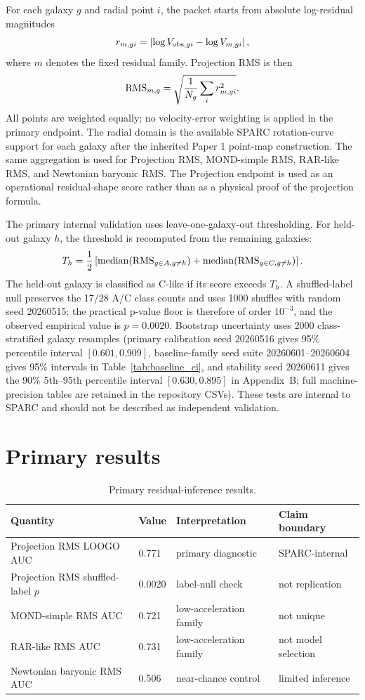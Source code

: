 \documentclass[11pt]{article}
\begin{document}
For each galaxy $g$ and radial point $i$, the packet starts from absolute log-residual magnitudes
\[
r_{{m,gi}} = \left|\log V_{{\rm obs},gi} - \log V_{{m,gi}}\right|,
\]
where $m$ denotes the fixed residual family. Projection RMS is then
\[
{\rm RMS}_{{m,g}} =
\sqrt{\frac{1}{N_g}\sum_i r_{{m,gi}}^2}.
\]
All points are weighted equally; no velocity-error weighting is applied in the primary endpoint. The radial domain is the available SPARC rotation-curve support for each galaxy after the inherited Paper 1 point-map construction. The same aggregation is used for Projection RMS, MOND-simple RMS, RAR-like RMS, and Newtonian baryonic RMS. The Projection endpoint is used as an operational residual-shape score rather than as a physical proof of the projection formula.

The primary internal validation uses leave-one-galaxy-out thresholding. For held-out galaxy $h$, the threshold is recomputed from the remaining galaxies:
\[
T_h=\frac{1}{2}\left[{\rm median}({\rm RMS}_{g\in A,g\ne h})+
{\rm median}({\rm RMS}_{g\in C,g\ne h})\right].
\]
The held-out galaxy is classified as C-like if its score exceeds $T_h$. A shuffled-label null preserves the 17/28 A/C class counts and uses 1000 shuffles with random seed 20260515; the practical p-value floor is therefore of order $10^{-3}$, and the observed empirical value is $p = 0.0020$. Bootstrap uncertainty uses 2000 class-stratified galaxy resamples (primary calibration seed 20260516 gives 95\% percentile interval $[0.601, 0.909]$, baseline-family seed suite 20260601--20260604 gives 95\% intervals in Table~\ref{tab:baseline_ci}, and stability seed 20260611 gives the 90\% 5th--95th percentile interval $[0.630, 0.895]$ in Appendix~B; full machine-precision tables are retained in the repository CSVs). These tests are internal to SPARC and should not be described as independent validation.

\section{Primary results}

\begin{table}[H]
\centering
\caption{Primary residual-inference results.}
\begin{tabular}{llll}
\toprule
Quantity & Value & Interpretation & Claim boundary\\
\midrule
Projection RMS LOOGO AUC & 0.771 & primary diagnostic & SPARC-internal\\
Projection RMS shuffled-label $p$ & 0.0020 & label-null check & not replication\\
MOND-simple RMS AUC & 0.721 & low-acceleration family & not unique\\
RAR-like RMS AUC & 0.731 & low-acceleration family & not model selection\\
Newtonian baryonic RMS AUC & 0.506 & near-chance control & limited inference\\
\bottomrule
\end{tabular}
\end{table}
\end{document}
